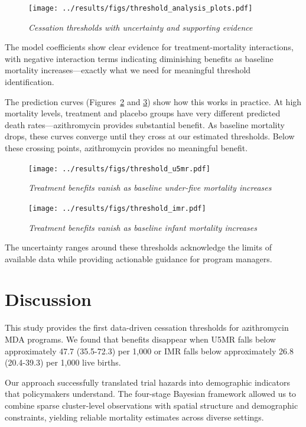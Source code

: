 \documentclass[11pt]{article}\usepackage[]{graphicx}\usepackage[]{xcolor}
\begin{document}
\begin{figure}[!h]
\centering
\texttt{[image: ../results/figs/threshold\_analysis\_plots.pdf]}
\caption{\emph{Cessation thresholds with uncertainty and supporting evidence}}
\label{fig:threshold-analysis}
\end{figure}

The model coefficients show clear evidence for treatment-mortality interactions, with negative interaction terms indicating diminishing benefits as baseline mortality increases---exactly what we need for meaningful threshold identification.

The prediction curves (Figures~\ref{fig:mortality-predictions1} and \ref{fig:mortality-predictions2}) show how this works in practice. At high mortality levels, treatment and placebo groups have very different predicted death rates---azithromycin provides substantial benefit. As baseline mortality drops, these curves converge until they cross at our estimated thresholds. Below these crossing points, azithromycin provides no meaningful benefit.

\begin{figure}[!h]
\centering
\texttt{[image: ../results/figs/threshold\_u5mr.pdf]}
\caption{\emph{Treatment benefits vanish as baseline under-five mortality increases}}
\label{fig:mortality-predictions1}
\end{figure}

\begin{figure}[!h]
\centering
\texttt{[image: ../results/figs/threshold\_imr.pdf]}
\caption{\emph{Treatment benefits vanish as baseline infant mortality increases}}
\label{fig:mortality-predictions2}
\end{figure}

The uncertainty ranges around these thresholds acknowledge the limits of available data while providing actionable guidance for program managers.

\section{Discussion}

This study provides the first data-driven cessation thresholds for azithromycin MDA programs. We found that benefits disappear when U5MR falls below approximately 47.7 (35.5-72.3) per 1,000 or IMR falls below approximately 26.8 (20.4-39.3) per 1,000 live births.

Our approach successfully translated trial hazards into demographic indicators that policymakers understand. The four-stage Bayesian framework allowed us to combine sparse cluster-level observations with spatial structure and demographic constraints, yielding reliable mortality estimates across diverse settings.
\end{document}
